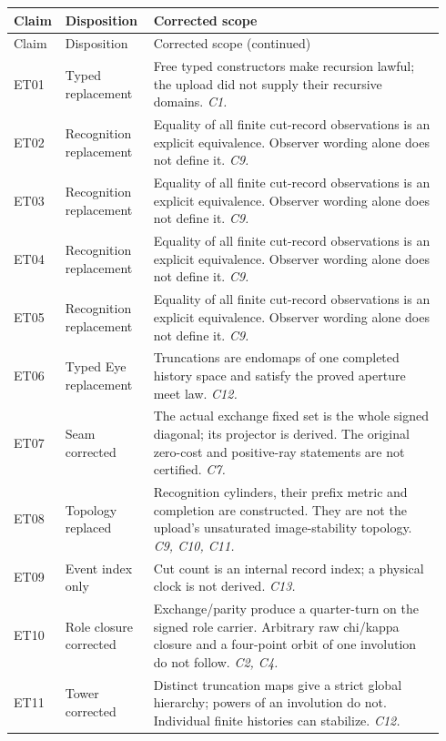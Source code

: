 \small
\begin{longtable}{@{}>{\raggedright\arraybackslash}p{0.08\linewidth}>{\raggedright\arraybackslash}p{0.20\linewidth}>{\raggedright\arraybackslash}p{0.66\linewidth}@{}}
\toprule
Claim & Disposition & Corrected scope \\
\midrule
\endfirsthead
\toprule
Claim & Disposition & Corrected scope (continued) \\
\midrule
\endhead
\bottomrule
\endfoot
ET01 & Typed replacement & Free typed constructors make recursion lawful; the upload did not supply their recursive domains. \emph{C1.} \\[5pt]
ET02 & Recognition replacement & Equality of all finite cut-record observations is an explicit equivalence. Observer wording alone does not define it. \emph{C9.} \\[5pt]
ET03 & Recognition replacement & Equality of all finite cut-record observations is an explicit equivalence. Observer wording alone does not define it. \emph{C9.} \\[5pt]
ET04 & Recognition replacement & Equality of all finite cut-record observations is an explicit equivalence. Observer wording alone does not define it. \emph{C9.} \\[5pt]
ET05 & Recognition replacement & Equality of all finite cut-record observations is an explicit equivalence. Observer wording alone does not define it. \emph{C9.} \\[5pt]
ET06 & Typed Eye replacement & Truncations are endomaps of one completed history space and satisfy the proved aperture meet law. \emph{C12.} \\[5pt]
ET07 & Seam corrected & The actual exchange fixed set is the whole signed diagonal; its projector is derived. The original zero-cost and positive-ray statements are not certified. \emph{C7.} \\[5pt]
ET08 & Topology replaced & Recognition cylinders, their prefix metric and completion are constructed. They are not the upload's unsaturated image-stability topology. \emph{C9, C10, C11.} \\[5pt]
ET09 & Event index only & Cut count is an internal record index; a physical clock is not derived. \emph{C13.} \\[5pt]
ET10 & Role closure corrected & Exchange/parity produce a quarter-turn on the signed role carrier. Arbitrary raw chi/kappa closure and a four-point orbit of one involution do not follow. \emph{C2, C4.} \\[5pt]
ET11 & Tower corrected & Distinct truncation maps give a strict global hierarchy; powers of an involution do not. Individual finite histories can stabilize. \emph{C12.} \\[5pt]

\end{longtable}
